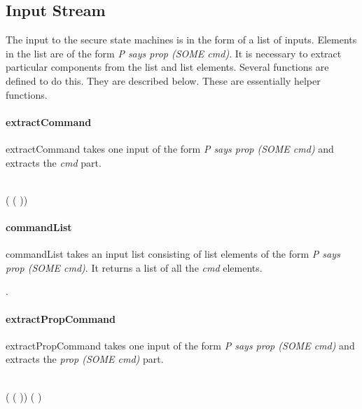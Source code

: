 \documentclass[../../main/main.tex]{subfiles}
\begin{document}
\subsection{Input Stream}
The input to the secure state machines is in the form of a list of inputs.  Elements in the list are of the form \textit{P says prop (SOME cmd)}.  It is necessary to extract particular components from the list and list elements.  Several functions are defined to do this.  They are described below.  These are essentially helper functions.

\paragraph*{extractCommand}
extractCommand takes one input of the form \textit{P says prop (SOME cmd)} and extracts the \textit{cmd} part.
\begin{tabbing}
\parskip=8pt
\HOLTokenTurnstile{} \\
\hspace{0.3cm} (   ( )) \HOLSymConst{=} 
\parskip=18pt
\end{tabbing}

\paragraph*{commandList}
commandList takes an input list consisting of list elements of the form \textit{P says prop (SOME cmd)}.  It returns a list of all the \textit{cmd} elements.
\begin{tabbing}
\parskip=8pt
\HOLTokenTurnstile{} \HOLSymConst{\HOLTokenForall{}}. \\
\hspace{0.3cm}   \HOLSymConst{=}   
\parskip=18pt
\end{tabbing}

\paragraph*{extractPropCommand}
extractPropCommand takes one input of the form \textit{P says prop (SOME cmd)} and extracts the \textit{prop (SOME cmd)} part.
\begin{tabbing}
\parskip=8pt
\HOLTokenTurnstile{}\\
\hspace{0.3cm}  (   ( )) \HOLSymConst{=}  ( )
\parskip=18pt
\end{tabbing}
\end{document}
